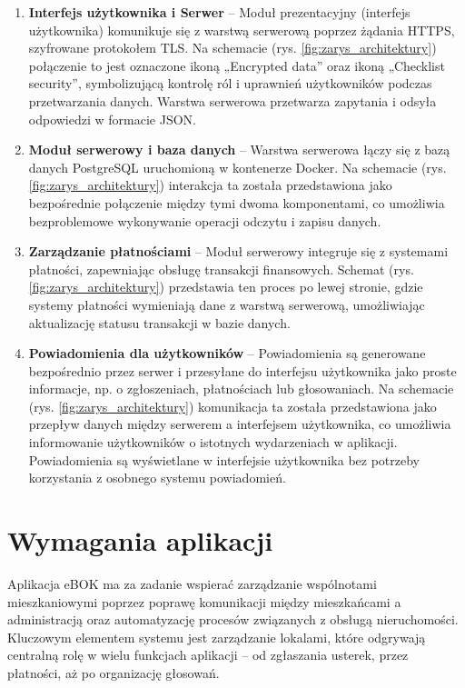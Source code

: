 \begin{enumerate}[label=\arabic*.]

	\item \textbf{Interfejs użytkownika i Serwer} – Moduł prezentacyjny (interfejs użytkownika) komunikuje się z warstwą serwerową poprzez żądania HTTPS, szyfrowane protokołem TLS. Na schemacie (rys. \ref{fig:zarys_architektury}) połączenie to jest oznaczone ikoną „Encrypted data” oraz ikoną „Checklist security”, symbolizującą kontrolę ról i uprawnień użytkowników podczas przetwarzania danych. Warstwa serwerowa przetwarza zapytania i odsyła odpowiedzi w formacie JSON.

	\item \textbf{Moduł serwerowy i baza danych} – Warstwa serwerowa łączy się z bazą danych PostgreSQL uruchomioną w kontenerze Docker. Na schemacie (rys. \ref{fig:zarys_architektury}) interakcja ta została przedstawiona jako bezpośrednie połączenie między tymi dwoma komponentami, co umożliwia bezproblemowe wykonywanie operacji odczytu i zapisu danych.

	\item \textbf{Zarządzanie płatnościami} – Moduł serwerowy integruje się z systemami płatności, zapewniając obsługę transakcji finansowych. Schemat (rys. \ref{fig:zarys_architektury}) przedstawia ten proces po lewej stronie, gdzie systemy płatności wymieniają dane z warstwą serwerową, umożliwiając aktualizację statusu transakcji w bazie danych.

	\item \textbf{Powiadomienia dla użytkowników} – Powiadomienia są generowane bezpośrednio przez serwer i przesyłane do interfejsu użytkownika jako proste informacje, np. o zgłoszeniach, płatnościach lub głosowaniach. Na schemacie (rys. \ref{fig:zarys_architektury}) komunikacja ta została przedstawiona jako przepływ danych między serwerem a interfejsem użytkownika, co umożliwia informowanie użytkowników o istotnych wydarzeniach w aplikacji. Powiadomienia są wyświetlane w interfejsie użytkownika bez potrzeby korzystania z osobnego systemu powiadomień.

	
\end{enumerate}


\section{Wymagania aplikacji} %

Aplikacja eBOK ma za zadanie wspierać zarządzanie wspólnotami mieszkaniowymi poprzez poprawę komunikacji między mieszkańcami a administracją oraz automatyzację procesów związanych z obsługą nieruchomości. Kluczowym elementem systemu jest zarządzanie lokalami, które odgrywają centralną rolę w wielu funkcjach aplikacji – od zgłaszania usterek, przez płatności, aż po organizację głosowań.

